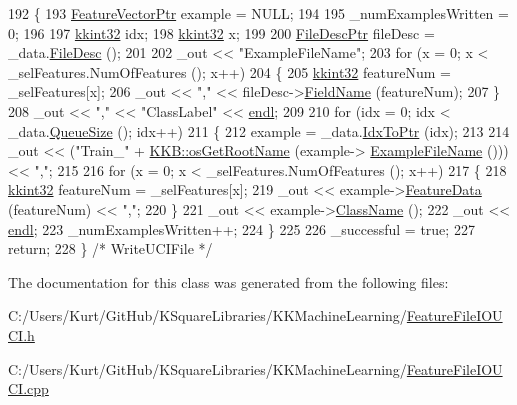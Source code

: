 \begin{DoxyCode}
192 \{
193   \hyperlink{class_k_k_m_l_l_1_1_feature_vector}{FeatureVectorPtr}   example = NULL;
194 
195   \_numExamplesWritten = 0;
196 
197   \hyperlink{namespace_k_k_b_a8fa4952cc84fda1de4bec1fbdd8d5b1b}{kkint32}  idx;
198   \hyperlink{namespace_k_k_b_a8fa4952cc84fda1de4bec1fbdd8d5b1b}{kkint32}  x;
199 
200   \hyperlink{class_k_k_m_l_l_1_1_file_desc}{FileDescPtr}  fileDesc = \_data.\hyperlink{class_k_k_m_l_l_1_1_feature_vector_list_a736923be9c4ac7553a5aa87dd24efd16}{FileDesc} ();
201 
202   \_out << \textcolor{stringliteral}{"ExampleFileName"};
203   \textcolor{keywordflow}{for}  (x = 0; x < \_selFeatures.NumOfFeatures (); x++)
204   \{
205     \hyperlink{namespace_k_k_b_a8fa4952cc84fda1de4bec1fbdd8d5b1b}{kkint32} featureNum = \_selFeatures[x];
206     \_out << \textcolor{stringliteral}{","} << fileDesc->\hyperlink{class_k_k_m_l_l_1_1_file_desc_a703b2f8283fc0cd4dfbf03308a9d0938}{FieldName} (featureNum);
207   \}
208   \_out << \textcolor{stringliteral}{","} << \textcolor{stringliteral}{"ClassLabel"} << \hyperlink{namespace_k_k_b_ad1f50f65af6adc8fa9e6f62d007818a8}{endl};
209 
210   \textcolor{keywordflow}{for}  (idx = 0; idx < \_data.\hyperlink{class_k_k_b_1_1_k_k_queue_a1dab601f75ee6a65d97f02bddf71c40d}{QueueSize} (); idx++)
211   \{
212     example = \_data.\hyperlink{class_k_k_b_1_1_k_k_queue_acce2bdd8b3327e38266cf198382cd852}{IdxToPtr} (idx);
213 
214     \_out << (\textcolor{stringliteral}{"Train\_"} + \hyperlink{namespace_k_k_b_af5b668ed9902d7f93b62529664a739f0}{KKB::osGetRootName} (example->
      \hyperlink{class_k_k_m_l_l_1_1_feature_vector_ab47c89ab1e9396664fdc0dc34b6e1ab5}{ExampleFileName} ())) << \textcolor{stringliteral}{","};
215 
216     \textcolor{keywordflow}{for}  (x = 0; x < \_selFeatures.NumOfFeatures (); x++)
217     \{
218       \hyperlink{namespace_k_k_b_a8fa4952cc84fda1de4bec1fbdd8d5b1b}{kkint32}  featureNum = \_selFeatures[x];
219       \_out << example->\hyperlink{class_k_k_m_l_l_1_1_feature_vector_af055b7c725a4d80a31cd2f6606cc37b6}{FeatureData} (featureNum) << \textcolor{stringliteral}{","};
220     \}
221     \_out << example->\hyperlink{class_k_k_m_l_l_1_1_feature_vector_a7c410c4ab70f5f2fdc8fca66ea8000ba}{ClassName} ();
222     \_out << \hyperlink{namespace_k_k_b_ad1f50f65af6adc8fa9e6f62d007818a8}{endl};
223     \_numExamplesWritten++;
224   \}
225 
226   \_successful = \textcolor{keyword}{true};
227   \textcolor{keywordflow}{return};
228 \}  \textcolor{comment}{/* WriteUCIFile */}
\end{DoxyCode}


The documentation for this class was generated from the following files\+:\begin{DoxyCompactItemize}
\item 
C\+:/\+Users/\+Kurt/\+Git\+Hub/\+K\+Square\+Libraries/\+K\+K\+Machine\+Learning/\hyperlink{_feature_file_i_o_u_c_i_8h}{Feature\+File\+I\+O\+U\+C\+I.\+h}\item 
C\+:/\+Users/\+Kurt/\+Git\+Hub/\+K\+Square\+Libraries/\+K\+K\+Machine\+Learning/\hyperlink{_feature_file_i_o_u_c_i_8cpp}{Feature\+File\+I\+O\+U\+C\+I.\+cpp}\end{DoxyCompactItemize}
